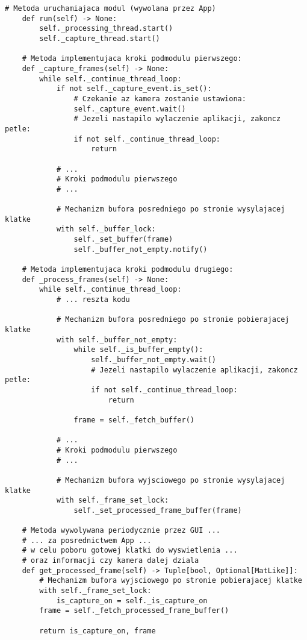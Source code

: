 \begin{lstlisting}[caption={Kod modułu silnika przetwarzania wideo z zawartymi mechanizami synchronizacji}, label={lst:engine-1}]
    # Metoda uruchamiajaca modul (wywolana przez App)
    def run(self) -> None:
        self._processing_thread.start()
        self._capture_thread.start()

    # Metoda implementujaca kroki podmodulu pierwszego:
    def _capture_frames(self) -> None:
        while self._continue_thread_loop:
            if not self._capture_event.is_set():
                # Czekanie az kamera zostanie ustawiona:
                self._capture_event.wait()
                # Jezeli nastapilo wylaczenie aplikacji, zakoncz petle: 
                if not self._continue_thread_loop:
                    return

            # ... 
            # Kroki podmodulu pierwszego
            # ...
            
            # Mechanizm bufora posredniego po stronie wysylajacej klatke
            with self._buffer_lock:
                self._set_buffer(frame)
                self._buffer_not_empty.notify()

    # Metoda implementujaca kroki podmodulu drugiego:
    def _process_frames(self) -> None:
        while self._continue_thread_loop:
            # ... reszta kodu

            # Mechanizm bufora posredniego po stronie pobierajacej klatke
            with self._buffer_not_empty:
                while self._is_buffer_empty():
                    self._buffer_not_empty.wait()
                    # Jezeli nastapilo wylaczenie aplikacji, zakoncz petle:
                    if not self._continue_thread_loop:  
                        return

                frame = self._fetch_buffer() 

            # ... 
            # Kroki podmodulu pierwszego
            # ...

            # Mechanizm bufora wyjsciowego po stronie wysylajacej klatke
            with self._frame_set_lock:
                self._set_processed_frame_buffer(frame)

    # Metoda wywolywana periodycznie przez GUI ... 
    # ... za posrednictwem App ... 
    # w celu poboru gotowej klatki do wyswietlenia ... 
    # oraz informacji czy kamera dalej dziala
    def get_processed_frame(self) -> Tuple[bool, Optional[MatLike]]:
        # Mechanizm bufora wyjsciowego po stronie pobierajacej klatke
        with self._frame_set_lock:
            is_capture_on = self._is_capture_on
        frame = self._fetch_processed_frame_buffer()
        
        return is_capture_on, frame
\end{lstlisting}